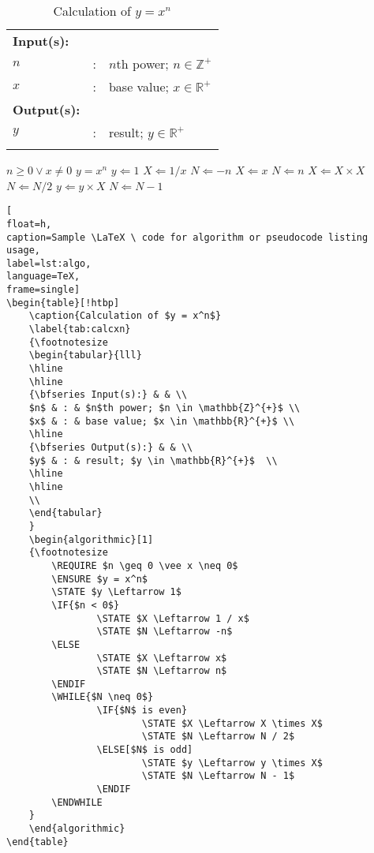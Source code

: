 \begin{table}[!htbp]
	\caption{Calculation of $y = x^n$}
	\label{tab:calcxn}
	{\footnotesize
	\begin{tabular}{lll}
	\hline
	\hline
	{\bfseries Input(s):} & & \\
	$n$ & : & $n$th power; $n \in \mathbb{Z}^{+}$ \\
	$x$ & : & base value; $x \in \mathbb{R}^{+}$ \\
	\hline
	{\bfseries Output(s):} & & \\
	$y$ & : & result; $y \in \mathbb{R}^{+}$  \\
	\hline
	\hline
	\\
	\end{tabular}
	}
	\begin{algorithmic}[1]
	{\footnotesize
		\REQUIRE $n \geq 0 \vee x \neq 0$
		\ENSURE $y = x^n$
		\STATE $y \Leftarrow 1$
				\STATE $X \Leftarrow 1 / x$
				\STATE $N \Leftarrow -n$
		\ELSE
				\STATE $X \Leftarrow x$
				\STATE $N \Leftarrow n$
		\ENDIF
						\STATE $X \Leftarrow X \times X$
						\STATE $N \Leftarrow N / 2$
				\ELSE[$N$ is odd]
						\STATE $y \Leftarrow y \times X$
						\STATE $N \Leftarrow N - 1$
				\ENDIF
		\ENDWHILE
	}	
	\end{algorithmic}
\end{table}
\cleardoublepage




\begin{lstlisting}[
float=h,
caption=Sample \LaTeX \ code for algorithm or pseudocode listing usage, 
label=lst:algo,
language=TeX,
frame=single]
\begin{table}[!htbp]
	\caption{Calculation of $y = x^n$}
	\label{tab:calcxn}
	{\footnotesize
	\begin{tabular}{lll}
	\hline
	\hline
	{\bfseries Input(s):} & & \\
	$n$ & : & $n$th power; $n \in \mathbb{Z}^{+}$ \\
	$x$ & : & base value; $x \in \mathbb{R}^{+}$ \\
	\hline
	{\bfseries Output(s):} & & \\
	$y$ & : & result; $y \in \mathbb{R}^{+}$  \\
	\hline
	\hline
	\\
	\end{tabular}
	}
	\begin{algorithmic}[1]
	{\footnotesize
		\REQUIRE $n \geq 0 \vee x \neq 0$
		\ENSURE $y = x^n$
		\STATE $y \Leftarrow 1$
		\IF{$n < 0$}
				\STATE $X \Leftarrow 1 / x$
				\STATE $N \Leftarrow -n$
		\ELSE
				\STATE $X \Leftarrow x$
				\STATE $N \Leftarrow n$
		\ENDIF
		\WHILE{$N \neq 0$}
				\IF{$N$ is even}
						\STATE $X \Leftarrow X \times X$
						\STATE $N \Leftarrow N / 2$
				\ELSE[$N$ is odd]
						\STATE $y \Leftarrow y \times X$
						\STATE $N \Leftarrow N - 1$
				\ENDIF
		\ENDWHILE
	}	
	\end{algorithmic}
\end{table}
\end{lstlisting}
\cleardoublepage




